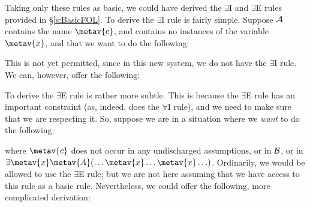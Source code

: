 Taking only these rules as basic, we could have derived the  $\exists$I and $\exists$E rules provided in \S\ref{s:BasicFOL}. To derive the $\exists$I rule is fairly simple. Suppose $\mathcal{A}$ contains the name $\metav{c}$, and contains no instances of the variable $\metav{x}$, and that we want to do the following:
\begin{fitchproof}
\end{fitchproof}
This is not yet permitted, since in this new system, we do not have the $\exists$I rule. We can, however, offer the following:
\begin{fitchproof}
	\open
	\close
\end{fitchproof}\noindent
To derive the $\exists$E rule is rather more subtle. This is because the $\exists$E rule has an important constraint (as, indeed, does the $\forall$I rule), and we need to make sure that we are respecting it. So, suppose we are in a situation where we \emph{want} to do the following:
\begin{fitchproof}
	\open
	\close
\end{fitchproof}\noindent
 where $\metav{c}$ does not occur in any undischarged assumptions, or in $\mathcal{B}$, or in $\exists \metav{x} \metav{A}(\ldots \metav{x} \ldots \metav{x}\ldots)$. Ordinarily, we would be allowed to use the $\exists$E rule; but we are not here assuming that we have access to this rule as a basic rule. Nevertheless, we could offer the following, more complicated derivation:
 
